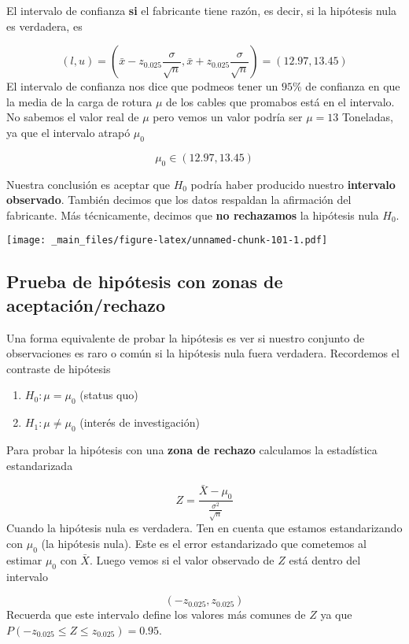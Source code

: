 \documentclass[
]{book}
\providecommand{\tightlist}{%
  \setlength{\itemsep}{0pt}\setlength{\parskip}{0pt}}
\begin{document}
El intervalo de confianza \textbf{si} el fabricante tiene razón, es decir, si la hipótesis nula es verdadera, es

\[(l,u)=(\bar{x}-z_{0.025} \frac{\sigma}{\sqrt{n}}, \bar{x}+z_{0.025} \frac{\sigma}{ \sqrt{n}})= (12.97,13.45)\]
El intervalo de confianza nos dice que podmeos tener un \(95\%\) de confianza en que la media de la carga de rotura \(\mu\) de los cables que promabos está en el intervalo. No sabemos el valor real de \(\mu\) pero vemos un valor podría ser \(\mu=13\) Toneladas, ya que el intervalo atrapó \(\mu_0\)

\[\mu_0\in (12.97,13.45)\]

Nuestra conclusión es aceptar que \(H_0\) podría haber producido nuestro \textbf{intervalo observado}. También decimos que los datos respaldan la afirmación del fabricante. Más técnicamente, decimos que \textbf{no rechazamos} la hipótesis nula \(H_0\).

\texttt{[image: \_main\_files/figure-latex/unnamed-chunk-101-1.pdf]}

\hypertarget{prueba-de-hipuxf3tesis-con-zonas-de-aceptaciuxf3nrechazo}{%
\subsection{Prueba de hipótesis con zonas de aceptación/rechazo}\label{prueba-de-hipuxf3tesis-con-zonas-de-aceptaciuxf3nrechazo}}

Una forma equivalente de probar la hipótesis es ver si nuestro conjunto de observaciones es raro o común si la hipótesis nula fuera verdadera. Recordemos el contraste de hipótesis

\begin{enumerate}
\def\labelenumi{\alph{enumi}.}
\tightlist
\item
  \(H_0:\mu = \mu_0\) (status quo)
\item
  \(H_1:\mu \neq \mu_0\) (interés de investigación)
\end{enumerate}

Para probar la hipótesis con una \textbf{zona de rechazo} calculamos la estadística estandarizada

\[Z=\frac{\bar{X}-\mu_0}{\frac{\sigma^2}{\sqrt{n}}}\]
Cuando la hipótesis nula es verdadera. Ten en cuenta que estamos estandarizando con \(\mu_0\) (la hipótesis nula). Este es el error estandarizado que cometemos al estimar \(\mu_0\) con \(\bar{X}\). Luego vemos si el valor observado de \(Z\) está dentro del intervalo

\[(-z_{0.025}, z_{0.025})\]
Recuerda que este intervalo define los valores más comunes de \(Z\) ya que \(P(-z_{0.025} \leq Z \leq z_{0.025})=0.95\).
\end{document}
